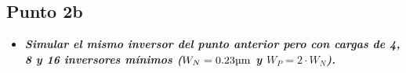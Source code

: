 
\subsection{Punto \textbf{2b}}

\begin{itemize}
\item \emph{\textbf{Simular el mismo inversor del punto anterior pero con cargas de \num{4}, \num{8} y \num{16} inversores mínimos ($W_{N} = 0.23 \si[per-mode=symbol]{\micro\meter}$ y $W_{P} = 2 \cdot W_{N}$).}}
\end{itemize}

